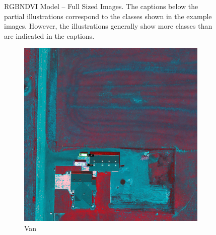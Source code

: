 \begin{figure}[h!]
    \caption[RGBNDVI Model – Full Sized Images]{RGBNDVI Model – Full Sized Images. The captions below the partial illustrations correspond to the classes shown in the example images. However, the illustrations generally show more classes than are indicated in the captions.}
    \label{fig:rgbndvi_perm_exp_examples_fs}
\end{figure}


\begin{figure}[h!]
    \centering
    \begin{subfigure}[t]{0.38\textwidth}
        \centering
        \includegraphics[width=\linewidth]{images/015Results/02perm_exp/comp_images/gbndvi/198.png}
        \caption{Van}
    \end{subfigure}
    \begin{subfigure}[t]{0.38\textwidth}
        \centering

\end{subfigure}
\end{figure}
